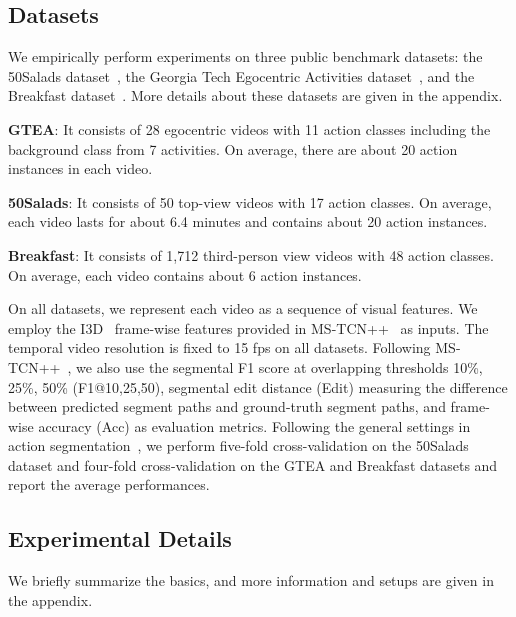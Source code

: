 \documentclass[letterpaper]{article} \usepackage[submission]{aaai23}  \usepackage{times}  \usepackage{helvet}  \usepackage{courier}  \usepackage[hyphens]{url}  \usepackage{graphicx} \urlstyle{rm} \def\UrlFont{\rm}  \usepackage{natbib}  \usepackage{caption} \frenchspacing  \setlength{\pdfpagewidth}{8.5in} \setlength{\pdfpageheight}{11in} \usepackage{algorithm}
\begin{document}
\subsection{Datasets}
We empirically perform experiments on three public benchmark datasets: the 50Salads dataset~\cite{stein2013combining}, the Georgia Tech Egocentric Activities dataset~\cite{fathi2011learning}, and the Breakfast dataset~\cite{kuehne2014language}. More details about these datasets are given in the appendix.

\textbf{GTEA}: It consists of 28 egocentric videos with 11 action classes including the background class from 7 activities. On average, there are about 20 action instances in each video.

\textbf{50Salads}: It consists of 50 top-view videos with 17 action classes. On average, each video lasts for about 6.4 minutes and contains about 20 action instances.

\textbf{Breakfast}: It consists of 1,712 third-person view videos with 48 action classes. On average, each video contains about 6 action instances.

On all datasets, we represent each video as a sequence of visual features. We employ the I3D~\cite{carreira2017quo} frame-wise features provided in MS-TCN++~\cite{li2020ms} as inputs. The temporal video resolution is fixed to 15 fps on all datasets. Following MS-TCN++~\cite{li2020ms}, we also use the segmental F1 score at overlapping thresholds 10\%, 25\%, 50\% (F1@{10,25,50}), segmental edit distance (Edit) measuring the difference between predicted segment paths and ground-truth segment paths, and frame-wise accuracy (Acc) as evaluation metrics. Following the general settings in action segmentation~\cite{farha2019ms,li2020ms}, we perform five-fold cross-validation on the 50Salads dataset and four-fold cross-validation on the GTEA and Breakfast datasets and report the average performances.

\subsection{Experimental Details}
We briefly summarize the basics, and more information and setups are given in the appendix.
\end{document}
